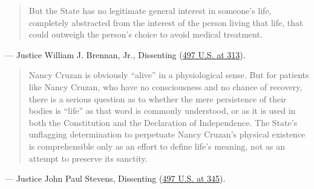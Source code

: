 \documentclass[12pt]{article}
\begin{document}
\begin{quote}
But the State has no legitimate general interest in someone's life, completely abstracted from the interest of the person living that life, that could outweigh the person's choice to avoid medical treatment.
\end{quote}
\noindent --- Justice William J. Brennan, Jr., Dissenting (\href{https://supreme.justia.com/cases/federal/us/497/261/}{497 U.S. at 313}).

\begin{quote}
Nancy Cruzan is obviously ``alive'' in a physiological sense. But for patients like Nancy Cruzan, who have no consciousness and no chance of recovery, there is a serious question as to whether the mere persistence of their bodies is ``life'' as that word is commonly understood, or as it is used in both the Constitution and the Declaration of Independence. The State's unflagging determination to perpetuate Nancy Cruzan's physical existence is comprehensible only as an effort to define life's meaning, not as an attempt to preserve its sanctity.
\end{quote}
\noindent --- Justice John Paul Stevens, Dissenting (\href{https://supreme.justia.com/cases/federal/us/497/261/}{497 U.S. at 345}).
\end{document}
